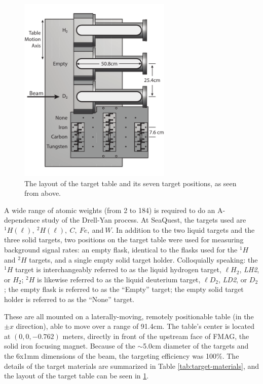\begin{figure}[p]
	\begin{center}
		\includegraphics[width=0.65\textwidth]{figures/target-tableLayout.pdf}
		\caption{The layout of the target table and its seven target positions, as seen from above.}
		\label{fig:table-layout}
	\end{center}
\end{figure}


A wide range of atomic weights (from 2 to 184) is required to do an A-dependence study of the Drell-Yan process.
At SeaQuest, the targets used are $^1H (\ell),\ ^2H (\ell),\ C,\ Fe,\ $and$\ W$. In addition to the two liquid targets
and the three solid targets, two positions on the target table were used for measuring background signal rates:
an empty flask, identical to the flasks used for the $^1H$ and $^2H$ targets, and a single empty solid target holder.
Colloquially speaking: the $^1H$ target is interchangeably referred to as the liquid hydrogen target, $\ell H_2$,
\emph{LH2}, or $H_2$; $^2H$ is likewise referred to as the liquid deuterium target, $\ell D_2$, \emph{LD2}, or $D_2$;
the empty flask is referred to as the ``Empty'' target; the empty solid target holder is referred to as the ``None'' target.

These are all mounted on a laterally-moving, remotely positionable table (in the $\pm x$ direction), able to move
over a range of 91.4cm. The table's center is located at $(0, 0, -0.762)$ meters, directly in front of the upstream face
of FMAG, the solid iron focusing magnet. Because of the $\sim$5.0cm diameter of the targets and the 6x1mm dimensions of the beam, the targeting efficiency was 100\%. The details of the target materials are summarized in Table \ref{tab:target-materials}, and the layout of the target table can be seen in \ref{fig:table-layout}.

